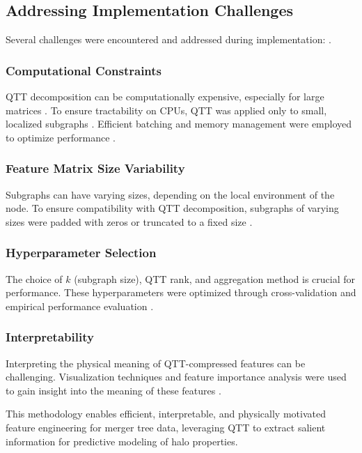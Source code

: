 \documentclass[twocolumn]{aastex631}
\begin{document}
\subsection{Addressing Implementation Challenges}
Several challenges were encountered and addressed during implementation: \citep{daiß2024asynchronousmanytasksystemschallengesopportunities,zingale2024challengesmodelingastrophysicalreacting,baker2025significantchallengesastrophysicalinference,pasquini2025reviewdetectorrequirementschallenges}.

\subsubsection{Computational Constraints}
QTT decomposition can be computationally expensive, especially for large matrices \citep{ye2024quantizedtensornetworkssolving}. To ensure tractability on CPUs, QTT was applied only to small, localized subgraphs \citep{ye2024quantizedtensornetworkssolving}. Efficient batching and memory management were employed to optimize performance \citep{ye2024quantizedtensornetworkssolving}.

\subsubsection{Feature Matrix Size Variability}
Subgraphs can have varying sizes, depending on the local environment of the node. To ensure compatibility with QTT decomposition, subgraphs of varying sizes were padded with zeros or truncated to a fixed size \citep{ye2024quantizedtensornetworkssolving}.

\subsubsection{Hyperparameter Selection}
The choice of \(k\) (subgraph size), QTT rank, and aggregation method is crucial for performance. These hyperparameters were optimized through cross-validation and empirical performance evaluation \citep{cerino2023hyperparameteroptimizationhpgreedyreduced,fowler2024futurelooksdarkimproving,thomas2025optimizingneuralnetworksurrogate}.

\subsubsection{Interpretability}
Interpreting the physical meaning of QTT-compressed features can be challenging. Visualization techniques and feature importance analysis were used to gain insight into the meaning of these features \citep{disanto2016analysisfeaturerelevanceclassification,meng2021machinelearninginterpretationcorrelation,ramos2024fastneuralemulatorinterstellar}.

This methodology enables efficient, interpretable, and physically motivated feature engineering for merger tree data, leveraging QTT to extract salient information for predictive modeling of halo properties.
\citep{16}\citep{17}\citep{18}\citep{30}
\end{document}
